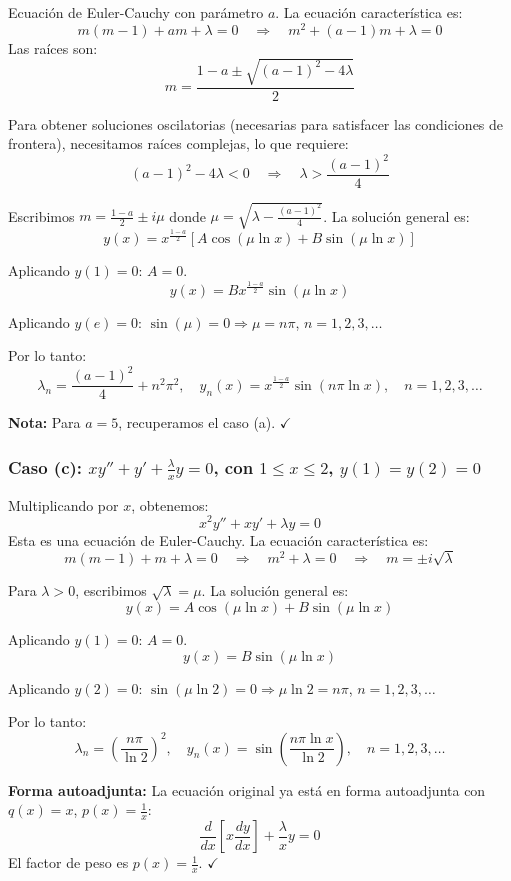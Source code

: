 \documentclass[a4paper]{article}
\begin{document}
Ecuación de Euler-Cauchy con parámetro $a$. La ecuación característica es:
$$
m(m-1) + am + \lambda = 0 \quad \Rightarrow \quad m^2 + (a-1)m + \lambda = 0
$$
Las raíces son:
$$
m = \frac{1-a \pm \sqrt{(a-1)^2 - 4\lambda}}{2}
$$

Para obtener soluciones oscilatorias (necesarias para satisfacer las condiciones de frontera), necesitamos raíces complejas, lo que requiere:
$$
(a-1)^2 - 4\lambda < 0 \quad \Rightarrow \quad \lambda > \frac{(a-1)^2}{4}
$$

Escribimos $m = \frac{1-a}{2} \pm i\mu$ donde $\mu = \sqrt{\lambda - \frac{(a-1)^2}{4}}$. La solución general es:
$$
y(x) = x^{\frac{1-a}{2}}\left[A \cos(\mu \ln x) + B \sin(\mu \ln x)\right]
$$

Aplicando $y(1) = 0$: $A = 0$.
$$
y(x) = B x^{\frac{1-a}{2}} \sin(\mu \ln x)
$$

Aplicando $y(e) = 0$: $\sin(\mu) = 0 \Rightarrow \mu = n\pi$, $n = 1, 2, 3, \dots$

Por lo tanto:
$$
\boxed{\lambda_n = \frac{(a-1)^2}{4} + n^2\pi^2, \quad y_n(x) = x^{\frac{1-a}{2}} \sin(n\pi \ln x), \quad n = 1, 2, 3, \dots}
$$

\textbf{Nota:} Para $a = 5$, recuperamos el caso (a). $\checkmark$

\subsubsection{Caso (c): $xy'' + y' + \frac{\lambda}{x}y = 0$, con $1 \leq x \leq 2$, $y(1) = y(2) = 0$}

Multiplicando por $x$, obtenemos:
$$
x^2y'' + xy' + \lambda y = 0
$$
Esta es una ecuación de Euler-Cauchy. La ecuación característica es:
$$
m(m-1) + m + \lambda = 0 \quad \Rightarrow \quad m^2 + \lambda = 0 \quad \Rightarrow \quad m = \pm i\sqrt{\lambda}
$$

Para $\lambda > 0$, escribimos $\sqrt{\lambda} = \mu$. La solución general es:
$$
y(x) = A \cos(\mu \ln x) + B \sin(\mu \ln x)
$$

Aplicando $y(1) = 0$: $A = 0$.
$$
y(x) = B \sin(\mu \ln x)
$$

Aplicando $y(2) = 0$: $\sin(\mu \ln 2) = 0 \Rightarrow \mu \ln 2 = n\pi$, $n = 1, 2, 3, \dots$

Por lo tanto:
$$
\boxed{\lambda_n = \left(\frac{n\pi}{\ln 2}\right)^2, \quad y_n(x) = \sin\left(\frac{n\pi \ln x}{\ln 2}\right), \quad n = 1, 2, 3, \dots}
$$

\textbf{Forma autoadjunta:} La ecuación original ya está en forma autoadjunta con $q(x) = x$, $p(x) = \frac{1}{x}$:
$$
\frac{d}{dx}\left[x \frac{dy}{dx}\right] + \frac{\lambda}{x} y = 0
$$
El factor de peso es $p(x) = \frac{1}{x}$. $\checkmark$
\end{document}
